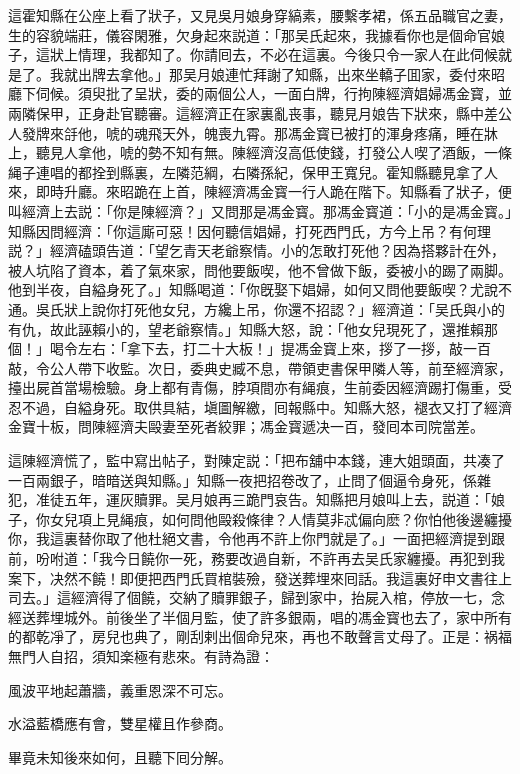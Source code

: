 這霍知縣在公座上看了狀子，又見吳月娘身穿縞素，腰繫孝裙，係五品職官之妻，生的容貌端莊，儀容閑雅，欠身起來説道：「那吴氏起來，我據看你也是個命官娘子，這狀上情理，我都知了。你請囘去，不必在這裏。今後只令一家人在此伺候就是了。我就出牌去拿他。」那吴月娘連忙拜謝了知縣，出來坐轎子囬家，委付來昭廳下伺候。須臾批了呈狀，委的兩個公人，一面白牌，行拘陳經濟娼婦馮金寳，並兩隣保甲，正身赴官聽審。這經濟正在家裏亂丧事，聽見月娘告下狀來，縣中差公人發牌來㧱他，唬的魂飛天外，魄喪九霄。那馮金寳已被打的渾身疼痛，睡在牀上，聽見人拿他，唬的勢不知有無。陳經濟沒高低使錢，打發公人喫了酒飯，一條䋲子連唱的都拴到縣裏，左隣范綱，右隣孫紀，保甲王寬兒。霍知縣聽見拿了人來，即時升廳。來昭跪在上首，陳經濟馮金寳一行人跪在階下。知縣看了狀子，便叫經濟上去説：「你是陳經濟？」又問那是馮金寳。那馮金寳道：「小的是馮金寳。」知縣因問經濟：「你這廝可惡！因何聽信娼婦，打死西門氏，方今上吊？有何理説？」經濟磕頭告道：「望乞青天老爺察情。小的怎敢打死他？因為搭夥計在外，被人坑陷了資本，着了氣來家，問他要飯喫，他不曾做下飯，委被小的踢了兩脚。他到半夜，自縊身死了。」知縣喝道：「你旣娶下娼婦，如何又問他要飯喫？尤說不通。吳氏狀上說你打死他女兒，方纔上吊，你還不招認？」經濟道：「吴氏與小的有仇，故此誣賴小的，望老爺察情。」知縣大怒，說：「他女兒現死了，還推賴那個！」喝令左右：「拿下去，打二十大板！」提馮金寳上來，拶了一拶，敲一百敲，令公人帶下收監。次日，委典史臧不息，帶領吏書保甲隣人等，前至經濟家，擡出屍首當場檢驗。身上都有青傷，脖項間亦有䋲痕，生前委因經濟踢打傷重，受忍不過，自縊身死。取供具結，塡圖解繳，囘報縣中。知縣大怒，褪衣又打了經濟金寶十板，問陳經濟夫毆妻至死者絞罪；馮金寳遞决一百，發囘本司院當差。

這陳經濟慌了，監中寫出帖子，對陳定説：「把布舖中本錢，連大姐頭面，共凑了一百兩銀子，暗暗送與知縣。」知縣一夜把招卷改了，止問了個逼令身死，係雜犯，准徒五年，運灰贖罪。吴月娘再三跪門哀告。知縣把月娘叫上去，説道：「娘子，你女兒項上見䋲痕，如何問他毆殺條律？人情莫非忒偏向麽？你怕他後邊纏擾你，我這裏替你取了他杜絕文書，令他再不許上你門就是了。」一面把經濟提到跟前，吩咐道：「我今日饒你一死，務要改過自新，不許再去吴氏家纏擾。再犯到我案下，决然不饒！即便把西門氏買棺裝殮，發送葬埋來囘話。我這裏好申文書往上司去。」這經濟得了個饒，交納了贖罪銀子，歸到家中，抬屍入棺，停放一七，念經送葬埋城外。前後坐了半個月監，使了許多銀兩，唱的馮金寳也去了，家中所有的都乾凈了，房兒也典了，剛刮剌出個命兒來，再也不敢聲言丈母了。正是：祸福無門人自招，須知楽極有悲來。有詩為證：

\begin{myquote}
風波平地起蕭牆，義重恩深不可忘。

水溢藍橋應有會，雙星權且作參商。
\end{myquote}

畢竟未知後來如何，且聽下囘分解。

